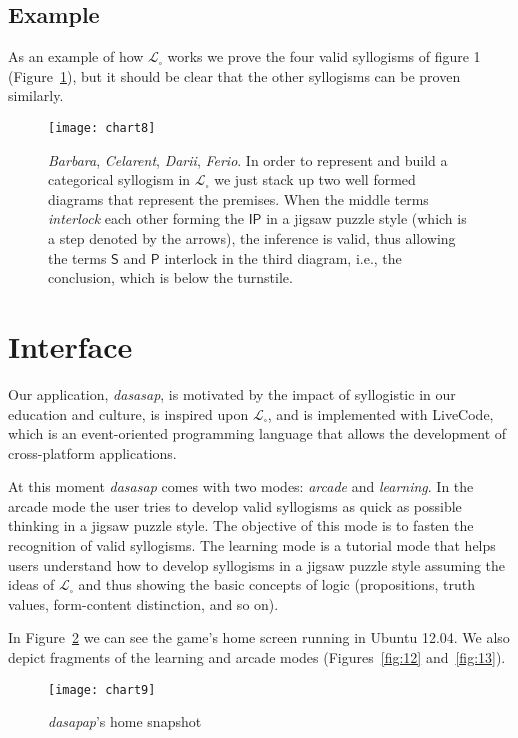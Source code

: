 \documentclass[a4paper,UKenglish]{lipics}
\begin{document}
\subsection{Example}\label{subsec:example}
As an example of how $\mathcal{L}_{\square}$ works we prove the four valid syllogisms of figure 1 (Figure~\ref{fig:10}), but it should be clear that the other syllogisms can be proven similarly. 

\begin{figure}[h]
  \texttt{[image: chart8]}
  \caption{\textit{Barbara}, \textit{Celarent}, \textit{Darii}, \textit{Ferio}. In order to represent and build a categorical syllogism in $\mathcal{L}_{\square}$ we just stack up two well formed diagrams that represent the premises. When the middle terms \textit{interlock} each other forming the $\mathsf{IP}$ in a jigsaw puzzle style (which is a step denoted by the arrows), the inference is valid, thus allowing the terms $\mathsf{S}$ and $\mathsf{P}$ interlock in the third diagram, i.e., the conclusion, which is below the turnstile.}
  \label{fig:10}
\end{figure}

\pagebreak

\section{Interface}
\label{sec:2}
Our application, \textit{dasasap}, is motivated by the impact of syllogistic in our education and culture, is inspired upon $\mathcal{L}_{\square}$, and is implemented with LiveCode, which is an event-oriented programming language that allows the development of cross-platform applications.  

At this moment \textit{dasasap} comes with two modes: \textit{arcade} and \textit{learning}. In the arcade mode the user tries to develop valid syllogisms as quick as possible thinking in a jigsaw puzzle style. The objective of this mode is to fasten the recognition of valid syllogisms. The learning mode is a tutorial mode that helps users understand how to develop syllogisms in a jigsaw puzzle style assuming the ideas of $\mathcal{L}_{\square}$ and thus showing the basic concepts of logic (propositions, truth values, form-content distinction, and so on). 

In Figure~\ref{fig:11} we can see the game's home screen running in Ubuntu 12.04. We also depict fragments of the learning and arcade modes (Figures~\ref{fig:12} and~\ref{fig:13}).  
 
\begin{figure}[h]
  \texttt{[image: chart9]}
  \caption{\textit{dasapap}'s home snapshot}  
  \label{fig:11}
\end{figure}
\end{document}
